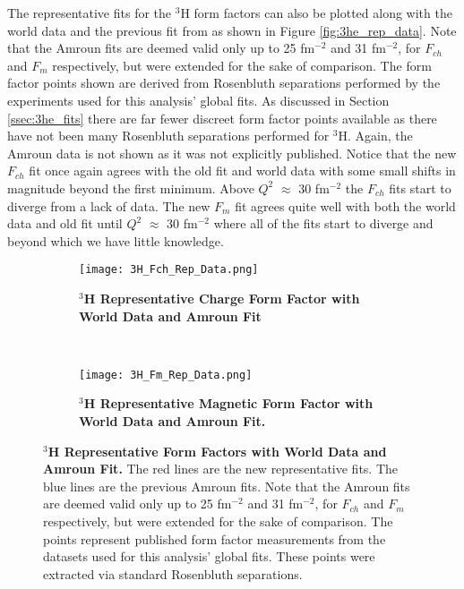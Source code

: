 The representative fits for the $^3$H form factors can also be plotted along with the world data and the previous fit from \cite{Article:Amroun} as shown in Figure \ref{fig:3he_rep_data}. Note that the Amroun fits are deemed valid only up to 25 fm$^{-2}$ and 31 fm$^{-2}$, for $F_{ch}$ and $F_m$ respectively, but were extended for the sake of comparison. The form factor points shown are derived from Rosenbluth separations performed by the experiments used for this analysis' global fits. As discussed in Section \ref{ssec:3he_fits} there are far fewer discreet form factor points available as there have not been many Rosenbluth separations performed for $^3$H. Again, the Amroun data is not shown as it was not explicitly published. Notice that the new $F_{ch}$ fit once again agrees with the old fit and world data with some small shifts in magnitude beyond the first minimum. Above $Q^2$ $\approx$ 30 fm$^{-2}$ the $F_{ch}$ fits start to diverge from a lack of data. The new $F_m$ fit agrees quite well with both the world data and old fit until $Q^2$ $\approx$ 30 fm$^{-2}$ where all of the fits start to diverge and beyond which we have little knowledge. 

 \begin{figure}[!ht]
\begin{subfigure}{1.\textwidth}
  \centering
  \texttt{[image: 3H\_Fch\_Rep\_Data.png]}
  \caption{\bf{$^3$H Representative Charge Form Factor with World Data and Amroun Fit}}
  \label{fig:3h_fch_rep_data}
\end{subfigure}\\
\begin{subfigure}{1.\textwidth}
  \centering
  \texttt{[image: 3H\_Fm\_Rep\_Data.png]}
  \caption{\bf{$^3$H Representative Magnetic Form Factor with World Data and Amroun Fit.}}
  \label{fig:3h_fm_rep_data}
\end{subfigure}
\caption[$^3$H Representative Form Factors with World Data and Amroun Fit] {
{\bf{$^3$H Representative Form Factors with World Data and Amroun Fit.}} The red lines are the new representative fits. The blue lines are the previous Amroun fits. Note that the Amroun fits are deemed valid only up to 25 fm$^{-2}$ and 31 fm$^{-2}$, for $F_{ch}$ and $F_m$ respectively, but were extended for the sake of comparison. The points represent published form factor measurements from the datasets used for this analysis' global fits. These points were extracted via standard Rosenbluth separations.}
\label{fig:3h_rep_data}
\end{figure}

